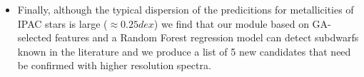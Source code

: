 \begin{itemize}
\item Finally, although the typical dispersion of the predicitions for metallicities of IPAC stars is large ($\approx 0.25 dex$) we find that our module based on GA-selected features and a Random Forest regression model can detect subdwarfs known in the literature and we produce a list of 5 new candidates that need be confirmed with higher resolution spectra.  

\end{itemize}
